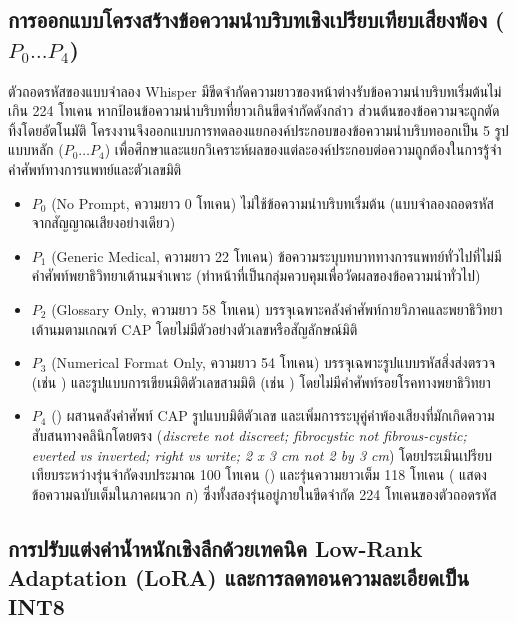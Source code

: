 \subsection{การออกแบบโครงสร้างข้อความนำบริบทเชิงเปรียบเทียบเสียงพ้อง ($P_0 \dots P_4$)}

ตัวถอดรหัสของแบบจำลอง Whisper \cite{radford2023whisper} มีขีดจำกัดความยาวของหน้าต่างรับข้อความนำบริบทเริ่มต้นไม่เกิน 224 โทเคน หากป้อนข้อความนำบริบทที่ยาวเกินขีดจำกัดดังกล่าว ส่วนต้นของข้อความจะถูกตัดทิ้งโดยอัตโนมัติ โครงงานจึงออกแบบการทดลองแยกองค์ประกอบของข้อความนำบริบทออกเป็น 5 รูปแบบหลัก ($P_0 \dots P_4$) เพื่อศึกษาและแยกวิเคราะห์ผลของแต่ละองค์ประกอบต่อความถูกต้องในการรู้จำคำศัพท์ทางการแพทย์และตัวเลขมิติ
\begin{itemize}
    \item $P_0$ (No Prompt, ความยาว 0 โทเคน) ไม่ใช้ข้อความนำบริบทเริ่มต้น (แบบจำลองถอดรหัสจากสัญญาณเสียงอย่างเดียว)
    \item $P_1$ (Generic Medical, ความยาว 22 โทเคน) ข้อความระบุบทบาททางการแพทย์ทั่วไปที่ไม่มีคำศัพท์พยาธิวิทยาเต้านมจำเพาะ (ทำหน้าที่เป็นกลุ่มควบคุมเพื่อวัดผลของข้อความนำทั่วไป)
    \item $P_2$ (Glossary Only, ความยาว 58 โทเคน) บรรจุเฉพาะคลังคำศัพท์กายวิภาคและพยาธิวิทยาเต้านมตามเกณฑ์ CAP โดยไม่มีตัวอย่างตัวเลขหรือสัญลักษณ์มิติ
    \item $P_3$ (Numerical Format Only, ความยาว 54 โทเคน) บรรจุเฉพาะรูปแบบรหัสสิ่งส่งตรวจ (เช่น ) และรูปแบบการเขียนมิติตัวเลขสามมิติ (เช่น ) โดยไม่มีคำศัพท์รอยโรคทางพยาธิวิทยา
    \item $P_4$ () ผสานคลังคำศัพท์ CAP รูปแบบมิติตัวเลข และเพิ่มการระบุคู่คำพ้องเสียงที่มักเกิดความสับสนทางคลินิกโดยตรง (\textit{discrete not discreet; fibrocystic not fibrous-cystic; everted vs inverted; right vs write; 2 x 3 cm not 2 by 3 cm}) โดยประเมินเปรียบเทียบระหว่างรุ่นจำกัดงบประมาณ 100 โทเคน () และรุ่นความยาวเต็ม 118 โทเคน ( แสดงข้อความฉบับเต็มในภาคผนวก ก) ซึ่งทั้งสองรุ่นอยู่ภายในขีดจำกัด 224 โทเคนของตัวถอดรหัส
\end{itemize}

\subsection{การปรับแต่งค่าน้ำหนักเชิงลึกด้วยเทคนิค Low-Rank Adaptation (LoRA) และการลดทอนความละเอียดเป็น INT8}


